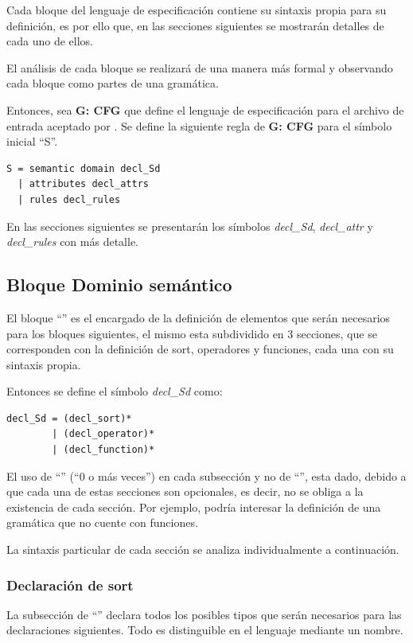Cada bloque del lenguaje de especificación contiene su sintaxis propia para su definición, es por ello que, en las secciones siguientes se mostrarán detalles de cada uno de ellos.

El análisis de cada bloque se realizará de una manera más formal y observando cada bloque como partes de una gramática.

Entonces, sea \textbf{G: CFG} que define el lenguaje de especificación para el archivo de entrada aceptado por \maggen. Se define la siguiente regla de \textbf{G: CFG} para el símbolo inicial ``S''.

\begin{lstlisting}[frame=shadowbox, language=specmag, linewidth=8cm]
S = semantic domain decl_Sd
  | attributes decl_attrs
  | rules decl_rules
\end{lstlisting}

En las secciones siguientes se presentarán los símbolos \textit{decl\_Sd}, \textit{decl\_attr} y \textit{decl\_rules} con más detalle.  

\subsection{Bloque Dominio semántico}
\label{subsec:bloq-sem}
El bloque ``'' es el encargado de la definición de elementos que serán necesarios para los bloques siguientes, el mismo esta subdividido en 3 secciones, que se corresponden con la definición de sort, operadores y funciones, cada una con su sintaxis propia. 

Entonces se define el símbolo \textit{decl\_Sd} como:

\begin{lstlisting}[frame=shadowbox, language=specmag, linewidth=8cm]
decl_Sd = (decl_sort)*
        | (decl_operator)*
        | (decl_function)*
\end{lstlisting}

El uso de ``\textbtt{*}'' (``0 o más veces'') en cada subsección y no de ``\textbtt{+}'', esta dado, debido a que cada una de estas secciones son opcionales, es decir, no se obliga a la existencia de cada sección. Por ejemplo, podría interesar la definición de una gramática que no cuente con funciones.

La sintaxis particular de cada sección se analiza individualmente a continuación.

\subsubsection{Declaración de sort}
La subsección de ``'' declara todos los posibles tipos que serán necesarios para las declaraciones siguientes. Todo  es distinguible en el lenguaje mediante un nombre.

